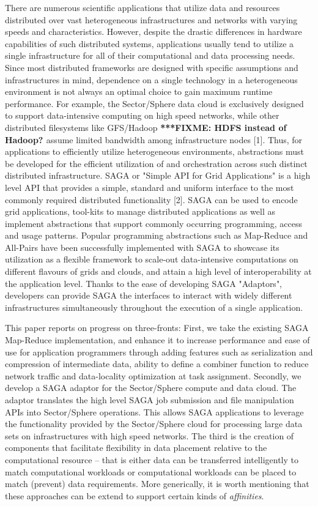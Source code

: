 \documentclass[a4paper,11pt]{article}
\newcommand{\fixme}[1]{ { \bf{ ***FIXME: #1 }} }
\newcommand{\fixme}[1]{}
\begin{document}
There are numerous scientific applications that utilize data and resources distributed over vast heterogeneous infrastructures and networks with varying speeds and characteristics. However, despite the drastic differences in hardware capabilities of such distributed systems, applications usually tend to utilize a single infrastructure for all of their computational and data processing needs. Since most distributed frameworks are designed with specific assumptions and infrastructures in mind, dependence on a single technology in a heterogeneous environment is not always an optimal choice to gain maximum runtime performance. For example, the Sector/Sphere data cloud is exclusively designed to support data-intensive computing on high speed networks, while other distributed filesystems like GFS/Hadoop \fixme{HDFS instead of Hadoop?} assume limited bandwidth among infrastructure nodes [1]. Thus, for applications to efficiently utilize heterogeneous environments, abstractions must be developed for the efficient utilization of and orchestration across such distinct distributed infrastructure.  SAGA or "Simple API for Grid Applications" is a high level API that provides a simple, standard and uniform interface to the most commonly required distributed functionality [2]. SAGA can be used to encode grid applications, tool-kits to manage distributed applications as well as implement abstractions that support commonly occurring programming, access and usage patterns. Popular programming abstractions such as Map-Reduce and All-Pairs have been successfully implemented with SAGA to showcase its utilization as a flexible framework to scale-out data-intensive computations on different flavours of grids and clouds, and attain a high level of interoperability at the application level. Thanks to the ease of developing SAGA "Adaptors", developers can provide SAGA the interfaces to interact with widely different infrastructures simultaneously throughout the execution of a single application.

This paper reports on progress on three-fronts: First, we take the existing SAGA Map-Reduce implementation, and enhance it to increase performance and ease of use for application programmers through adding features such as serialization and compression of intermediate data, ability to define a combiner function to reduce network traffic and data-locality optimization at task assignment.
Secondly, we develop a SAGA adaptor for the Sector/Sphere compute and data cloud. The adaptor translates the high level SAGA job submission and file manipulation APIs into Sector/Sphere operations. This allows SAGA applications to leverage the functionality provided by the Sector/Sphere cloud for processing large data sets on infrastructures with high speed networks.  The third is the creation of components that facilitate flexibility in data placement relative to the computational resource -- that is either data can be transferred intelligently to match computational workloads or computational workloads can be placed to match (prevent) data requirements. More generically, it is worth mentioning that these approaches can be extend to support certain kinds of {\it affinities}.
\end{document}
